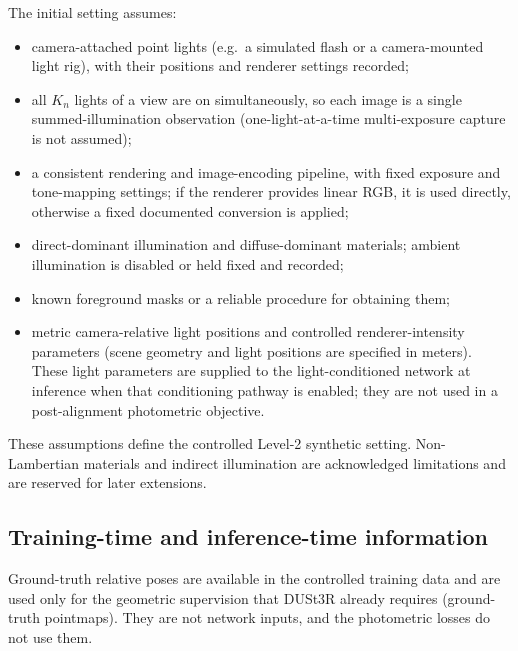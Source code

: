\documentclass[11pt,a4paper]{article}
\begin{document}
The initial setting assumes:
\begin{itemize}
  \item camera-attached point lights (e.g.\ a simulated flash or a
  camera-mounted light rig), with their positions and renderer settings recorded;
  \item all $K_n$ lights of a view are on simultaneously, so each image is a
  single summed-illumination observation (one-light-at-a-time multi-exposure
  capture is not assumed);
  \item a consistent rendering and image-encoding pipeline, with fixed exposure
  and tone-mapping settings; if the renderer provides linear RGB, it is used
  directly, otherwise a fixed documented conversion is applied;
  \item direct-dominant illumination and diffuse-dominant materials; ambient
  illumination is disabled or held fixed and recorded;
  \item known foreground masks or a reliable procedure for obtaining them;
  \item metric camera-relative light positions and controlled renderer-intensity
  parameters (scene geometry and light positions are specified in meters).
  These light parameters are supplied to the light-conditioned network at
  inference when that conditioning pathway is enabled; they are not used in
  a post-alignment photometric objective.
\end{itemize}
These assumptions define the controlled Level-2 synthetic setting. Non-Lambertian
materials and indirect illumination are acknowledged limitations and are
reserved for later extensions.

\subsection{Training-time and inference-time information}

Ground-truth relative poses are available in the controlled training data
and are used only for the geometric supervision that DUSt3R already
requires (ground-truth pointmaps). They are not network inputs, and the
photometric losses do not use them.
\end{document}
